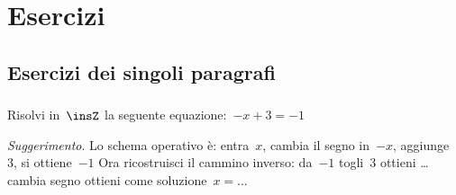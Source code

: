 
\section{Esercizi}

\subsection{Esercizi dei singoli paragrafi}

\subsubsection*{}

\begin{esercizio}
\label{ese:13.1}
Risolvi in~\(\insZ\) la seguente equazione:~\(-x+3=-1\)

\emph{Suggerimento}. Lo schema operativo è: entra~\(x\), cambia il segno in~\(-x\), 
aggiunge~\(3\), si ottiene~\(-1\)
Ora ricostruisci il cammino inverso: da~\(-1\) togli~\(3\) ottieni \ldots cambia 
segno ottieni come soluzione~\(x = \ldots\)
\end{esercizio}

\subsubsection*{}

